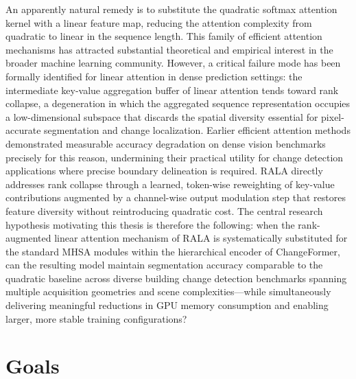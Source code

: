 An apparently natural remedy is to substitute the quadratic softmax attention
kernel with a linear feature map, reducing the attention complexity from
quadratic to linear in the sequence length. This family of efficient attention
mechanisms has attracted substantial theoretical and empirical interest in the
broader machine learning community. However, a critical failure mode has been
formally identified for linear attention in dense prediction settings: the
intermediate key-value aggregation buffer of linear attention tends toward
rank collapse, a degeneration in which the aggregated sequence representation
occupies a low-dimensional subspace that discards the spatial diversity essential
for pixel-accurate segmentation and change localization. Earlier efficient
attention methods demonstrated measurable accuracy degradation on dense vision
benchmarks precisely for this reason, undermining their practical utility for
change detection applications where precise boundary delineation is required.
RALA \cite{Fan2025RALA} directly addresses rank collapse through a learned,
token-wise reweighting of key-value contributions augmented by a channel-wise
output modulation step that restores feature diversity without reintroducing
quadratic cost. The central research hypothesis motivating this thesis is
therefore the following: when the rank-augmented linear attention mechanism of
RALA is systematically substituted for the standard MHSA modules within the
hierarchical encoder of ChangeFormer, can the resulting model maintain
segmentation accuracy comparable to the quadratic baseline across diverse
building change detection benchmarks spanning multiple acquisition geometries
and scene complexities---while simultaneously delivering meaningful reductions
in GPU memory consumption and enabling larger, more stable training
configurations?


\section{Goals}

